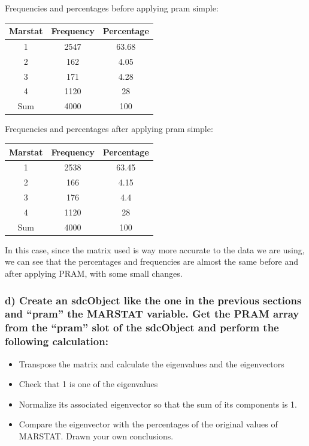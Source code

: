 \documentclass[
]{article}
\providecommand{\tightlist}{%
  \setlength{\itemsep}{0pt}\setlength{\parskip}{0pt}}
\begin{document}
Frequencies and percentages before applying pram simple:

\begin{longtable}[]{@{}ccc@{}}
\toprule()
Marstat & Frequency & Percentage \\
\midrule()
\endhead
1 & 2547 & 63.68 \\
2 & 162 & 4.05 \\
3 & 171 & 4.28 \\
4 & 1120 & 28 \\
Sum & 4000 & 100 \\
\bottomrule()
\end{longtable}

Frequencies and percentages after applying pram simple:

\begin{longtable}[]{@{}ccc@{}}
\toprule()
Marstat & Frequency & Percentage \\
\midrule()
\endhead
1 & 2538 & 63.45 \\
2 & 166 & 4.15 \\
3 & 176 & 4.4 \\
4 & 1120 & 28 \\
Sum & 4000 & 100 \\
\bottomrule()
\end{longtable}

In this case, since the matrix used is way more accurate to the data we
are using, we can see that the percentages and frequencies are almost
the same before and after applying PRAM, with some small changes.

\hypertarget{d-create-an-sdcobject-like-the-one-in-the-previous-sections-and-pram-the-marstat-variable.-get-the-pram-array-from-the-pram-slot-of-the-sdcobject-and-perform-the-following-calculation}{%
\subsubsection{d) Create an sdcObject like the one in the previous
sections and ``pram'' the MARSTAT variable. Get the PRAM array from the
``pram'' slot of the sdcObject and perform the following
calculation:}\label{d-create-an-sdcobject-like-the-one-in-the-previous-sections-and-pram-the-marstat-variable.-get-the-pram-array-from-the-pram-slot-of-the-sdcobject-and-perform-the-following-calculation}}

\begin{itemize}
\tightlist
\item
  Transpose the matrix and calculate the eigenvalues and the
  eigenvectors
\item
  Check that 1 is one of the eigenvalues
\item
  Normalize its associated eigenvector so that the sum of its components
  is 1.
\item
  Compare the eigenvector with the percentages of the original values of
  MARSTAT. Drawn your own conclusions.
\end{itemize}
\end{document}
